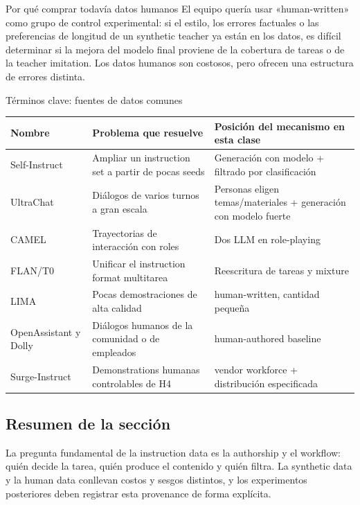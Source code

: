 
\begin{importantbox}{Por qué comprar todavía datos humanos}
El equipo quería usar «human-written» como grupo de control experimental: si el estilo, los errores factuales o las preferencias de longitud de un synthetic teacher ya están en los datos, es difícil determinar si la mejora del modelo final proviene de la cobertura de tareas o de la teacher imitation. Los datos humanos son costosos, pero ofrecen una estructura de errores distinta.
\end{importantbox}


\begin{knowledgebox}{Términos clave: fuentes de datos comunes}
\begin{tabularx}{\textwidth}{@{}L{0.18\textwidth}L{0.25\textwidth}X@{}}
\toprule
Nombre & Problema que resuelve & Posición del mecanismo en esta clase \\
\midrule
Self-Instruct & Ampliar un instruction set a partir de pocas seeds & Generación con modelo + filtrado por clasificación \\
UltraChat & Diálogos de varios turnos a gran escala & Personas eligen temas/materiales + generación con modelo fuerte \\
CAMEL & Trayectorias de interacción con roles & Dos LLM en role-playing \\
FLAN/T0 & Unificar el instruction format multitarea & Reescritura de tareas y mixture \\
LIMA & Pocas demostraciones de alta calidad & human-written, cantidad pequeña \\
OpenAssistant y Dolly & Diálogos humanos de la comunidad o de empleados & human-authored baseline \\
Surge-Instruct & Demonstrations humanas controlables de H4 & vendor workforce + distribución especificada \\
\bottomrule
\end{tabularx}
\end{knowledgebox}

\subsection{Resumen de la sección}

La pregunta fundamental de la instruction data es la authorship y el workflow: quién decide la tarea, quién produce el contenido y quién filtra. La synthetic data y la human data conllevan costos y sesgos distintos, y los experimentos posteriores deben registrar esta provenance de forma explícita.

